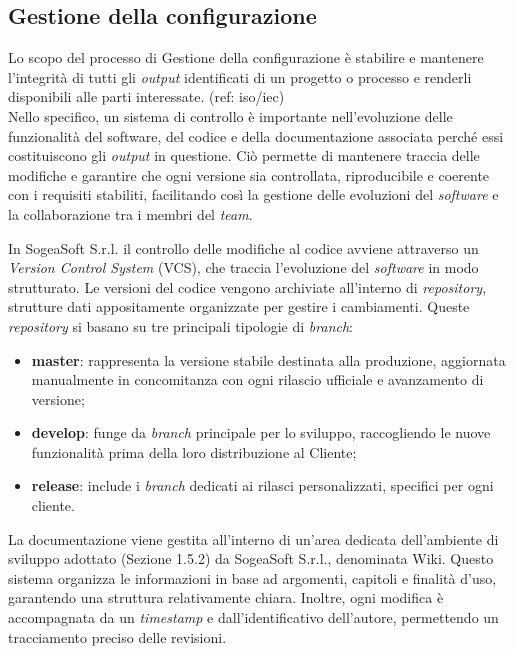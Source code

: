         \subsection{Gestione della configurazione}
        Lo scopo del processo di Gestione della configurazione è stabilire e mantenere l'integrità di tutti gli \textit{output} identificati di un progetto o processo e renderli disponibili alle parti interessate. (ref: iso/iec)\\
        \noindent Nello specifico, un sistema di controllo è importante nell'evoluzione delle funzionalità del software, del codice e della documentazione associata perché essi costituiscono gli \textit{output} in questione. Ciò permette di mantenere traccia delle modifiche e garantire che ogni versione sia controllata, riproducibile e coerente con i requisiti stabiliti, facilitando così la gestione delle evoluzioni del \textit{software} e la collaborazione tra i membri del \textit{team}. 

        \noindent In SogeaSoft S.r.l. il controllo delle modifiche al codice avviene attraverso un \textit{Version Control System} (VCS), che traccia l’evoluzione del \textit{software} in modo strutturato. Le versioni del codice vengono archiviate all’interno di \textit{repository}, strutture dati appositamente organizzate per gestire i cambiamenti. 
        \noindent Queste \textit{repository} si basano su tre principali tipologie di \textit{branch}:  
        \begin{itemize}
            \item \textbf{master}: rappresenta la versione stabile destinata alla produzione, aggiornata manualmente in concomitanza con ogni rilascio ufficiale e avanzamento di versione; 
            \item \textbf{develop}: funge da \textit{branch} principale per lo sviluppo, raccogliendo le nuove funzionalità prima della loro distribuzione al Cliente; 
            \item \textbf{release}: include i \textit{branch} dedicati ai rilasci personalizzati, specifici per ogni cliente.  
        \end{itemize}

        \noindent La documentazione viene gestita all'interno di un'area dedicata dell'ambiente di sviluppo adottato (Sezione 1.5.2) da SogeaSoft S.r.l., denominata Wiki. Questo sistema organizza le informazioni in base ad argomenti, capitoli e finalità d'uso, garantendo una struttura relativamente chiara. Inoltre, ogni modifica è accompagnata da un \textit{timestamp} e dall'identificativo dell'autore, permettendo un tracciamento preciso delle revisioni. 
        
